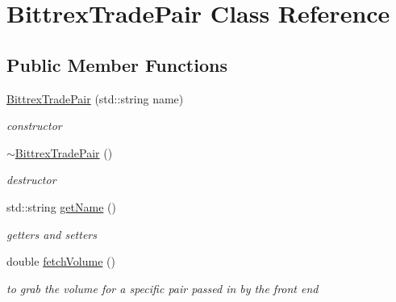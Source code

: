 \hypertarget{class_bittrex_trade_pair}{}\section{Bittrex\+Trade\+Pair Class Reference}
\label{class_bittrex_trade_pair}
\subsection*{Public Member Functions}
\begin{DoxyCompactItemize}
\item 
\mbox{\label{class_bittrex_trade_pair_ab6da87febee0387eb320553ccd0dc4ce}} 
\mbox{\hyperlink{class_bittrex_trade_pair_ab6da87febee0387eb320553ccd0dc4ce}{Bittrex\+Trade\+Pair}} (std\+::string name)
\begin{DoxyCompactList}\small\item\em constructor \end{DoxyCompactList}\item 
\mbox{\label{class_bittrex_trade_pair_a13b7e834b50ce3b7f773a40d7a4828a6}} 
\mbox{\hyperlink{class_bittrex_trade_pair_a13b7e834b50ce3b7f773a40d7a4828a6}{$\sim$\+Bittrex\+Trade\+Pair}} ()
\begin{DoxyCompactList}\small\item\em destructor \end{DoxyCompactList}\item 
\mbox{\label{class_bittrex_trade_pair_aabb1730857c694a64b15eaf5824ec72a}} 
std\+::string \mbox{\hyperlink{class_bittrex_trade_pair_aabb1730857c694a64b15eaf5824ec72a}{get\+Name}} ()
\begin{DoxyCompactList}\small\item\em getters and setters \end{DoxyCompactList}\item 
double \mbox{\hyperlink{class_bittrex_trade_pair_a314efdd2917c88f48cd521dacf4eed85}{fetch\+Volume}} ()
\begin{DoxyCompactList}\small\item\em to grab the volume for a specific pair passed in by the front end \end{DoxyCompactList}\item 
\mbox{\label{class_bittrex_trade_pair_afd555c5ae36025d25964350c50f1006a}} 

\end{DoxyCompactItemize}
